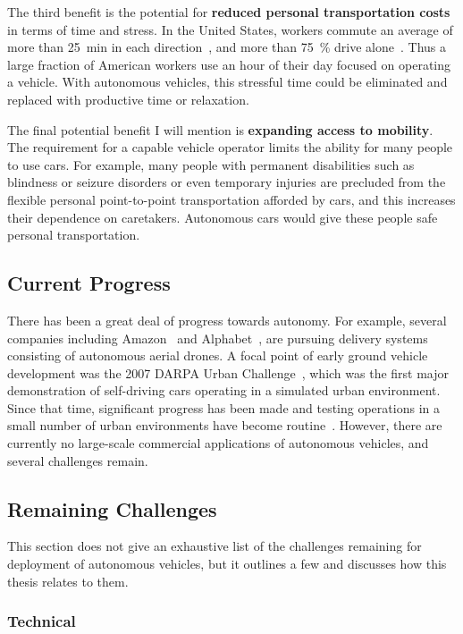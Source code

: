The third benefit is the potential for \textbf{reduced personal transportation costs} in terms of time and stress.
In the United States, workers commute an average of more than \SI{25}{\minute} in each direction~\cite{census2016travel}, and more than \SI{75}{\percent} drive alone~\cite{mckenzie2015who}.
Thus a large fraction of American workers use an hour of their day focused on operating a vehicle.
With autonomous vehicles, this stressful time could be eliminated and replaced with productive time or relaxation.

The final potential benefit I will mention is \textbf{expanding access to mobility}.
The requirement for a capable vehicle operator limits the ability for many people to use cars.
For example, many people with permanent disabilities such as blindness or seizure disorders or even temporary injuries are precluded from the flexible personal point-to-point transportation afforded by cars, and this increases their dependence on caretakers.
Autonomous cars would give these people safe personal transportation.

\subsection{Current Progress}

There has been a great deal of progress towards autonomy.
For example, several companies including Amazon~\cite{shaban2018amazon} and Alphabet~\cite{sandoval2018alphabet}, are pursuing delivery systems consisting of autonomous aerial drones.
A focal point of early ground vehicle development was the 2007 DARPA Urban Challenge~\cite{MB-KI-SS:10}, which was the first major demonstration of self-driving cars operating in a simulated urban environment.
Since that time, significant progress has been made and testing operations in a small number of urban environments have become routine~\cite{dolgov2016google}.
However, there are currently no large-scale commercial applications of autonomous vehicles, and several challenges remain.

\subsection{Remaining Challenges}

This section does not give an exhaustive list of the challenges remaining for deployment of autonomous vehicles, but it outlines a few and discusses how this thesis relates to them.

\subsubsection{Technical}

